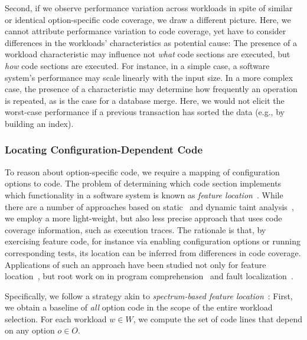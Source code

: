 {Second, if we observe performance variation across workloads in spite of similar or identical option-specific code coverage, we draw a different picture. Here, we cannot attribute performance variation to code coverage, yet have to consider differences in the workloads’ characteristics as potential cause: The presence of a workload characteristic may influence not  \emph{what} code sections are executed, but \emph{how} code sections are executed. For instance, in a simple case, a software system’s performance may scale linearly with the input size. In a more complex case, the presence of a characteristic may determine how frequently an operation is repeated, as is the case for a database merge. Here, we would not elicit the worst-case performance if a previous transaction has sorted the data (e.g., by building an index).

\subsubsection{Locating Configuration-Dependent Code}
To reason about option-specific code, we require a mapping of configuration options to code. 
The problem of determining which code section implements which functionality in a software system is known as \emph{feature location}~\cite{rubin_feature_2013}. 
While there are a number of approaches based on static~\cite{velez_2020_configcrusher_jase,lillack_2018_lotrack_tse,luo_2019_cova} and dynamic taint analysis~\cite{bell_phosphor_2014,velez_comprex_2021,splat_kim_2013}, we employ a more light-weight,  but also less precise approach that uses code coverage information, such as execution traces.
The rationale is that, by exercising feature code, for instance via enabling configuration options or running corresponding tests, its location can be inferred from differences in code coverage. 
Applications of such an approach have been studied not only for feature location~\cite{wong_integrated_2005,sulir_annotation_2015,michelon_spectrum_2021,perez_framing_2016}, but root work on in program comprehension~\cite{wilde_early_1996,wilde_reconnaissance_1995,sherwood_reducing_nodate,perez_diagnosis_2014,castro_pangolin_2019} and fault localization~\cite{agrawal_fault_1995,wong_faultloc_2016}. 
}
Specifically, we follow  a strategy akin to  \textit{spectrum-based feature location}~\cite{michelon_spectrum_2021}:
First, we obtain a baseline of \textit{all} option code in the scope of the entire workload selection. For each workload $w \in W$, we compute the set of code lines that depend on any option $o \in O$. 
